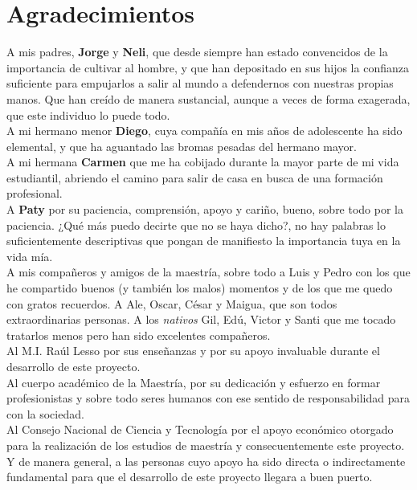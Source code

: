 \chapter*{Agradecimientos}


A mis padres, \textbf{Jorge} y \textbf{Neli}, que desde siempre han estado convencidos de la importancia de cultivar al hombre, y que 
han depositado en sus hijos la confianza suficiente para empujarlos a salir al mundo a 
defendernos con nuestras propias manos. Que han creído de manera sustancial, aunque a veces de forma 
exagerada, que este individuo lo puede todo.\\

A mi hermano menor \textbf{Diego}, cuya compañía en mis años de adolescente ha sido elemental, y que ha 
aguantado las bromas pesadas del hermano mayor.\\

A mi hermana \textbf{Carmen} que me ha cobijado durante la mayor parte de mi vida estudiantil, 
abriendo el camino para salir de casa en busca de una formación profesional.\\

A \textbf{Paty} por su paciencia, comprensión, apoyo y cariño, bueno, sobre todo por la paciencia. ¿Qué más 
puedo decirte que no se haya dicho?, no hay palabras lo suficientemente descriptivas que pongan de manifiesto 
la importancia tuya en la vida mía. \\

A mis compañeros y amigos de la maestría, sobre todo a Luis y Pedro con los que he compartido buenos (y también los malos) 
momentos y de los que me quedo con gratos recuerdos. A Ale, Oscar, César y Maigua, que son todos extraordinarias personas. 
A los \textit{nativos} Gil, Edú, Victor y Santi que me tocado tratarlos menos pero han sido excelentes compañeros. \\

Al M.I. Raúl Lesso por sus enseñanzas y por su apoyo invaluable durante el desarrollo de este proyecto.\\

Al cuerpo académico de la Maestría, por su dedicación y esfuerzo en formar profesionistas y sobre todo 
seres humanos con ese sentido de responsabilidad para con la sociedad.\\

Al Consejo Nacional de Ciencia y Tecnología por el apoyo económico otorgado para la realización de los estudios 
de maestría y consecuentemente este proyecto.\\

Y de manera general, a las personas cuyo apoyo ha sido directa o indirectamente fundamental para 
que el desarrollo de este proyecto llegara a buen puerto.